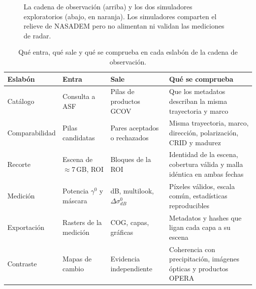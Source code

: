 \documentclass[11pt,a4paper]{article}
\newcommand{\gz}{\ensuremath{\gamma^{0}}}
\begin{document}
\begin{figure}[htbp]
\centering
{}
\caption{La cadena de observación (arriba) y los dos simuladores exploratorios (abajo, en naranja). Los
simuladores comparten el relieve de NASADEM pero no alimentan ni validan las mediciones de radar.}
\label{fig:cadena-datos}
\end{figure}

\begin{table}[htbp]
\centering\small
\begin{tabularx}{\linewidth}{p{.19\linewidth}p{.24\linewidth}p{.22\linewidth}X}
\toprule
\textbf{Eslabón} & \textbf{Entra} & \textbf{Sale} & \textbf{Qué se comprueba}\\\midrule
Catálogo & Consulta a ASF & Pilas de productos GCOV & Que los metadatos describan la misma trayectoria y marco\\
Comparabilidad & Pilas candidatas & Pares aceptados o rechazados & Misma trayectoria, marco, dirección, polarización, CRID y madurez\\
Recorte & Escena de $\approx$7\,GB, ROI & Bloques de la ROI & Identidad de la escena, cobertura válida y malla idéntica en ambas fechas\\
Medición & Potencia \gz{} y máscara & dB, multilook, $\Delta\sigma^0_{dB}$ & Píxeles válidos, escala común, estadísticas reproducibles\\
Exportación & Rasters de la medición & COG, capas, gráficas & Metadatos y hashes que ligan cada capa a su escena\\
Contraste & Mapas de cambio & Evidencia independiente & Coherencia con precipitación, imágenes ópticas y productos OPERA\\\bottomrule
\end{tabularx}
\caption{Qué entra, qué sale y qué se comprueba en cada eslabón de la cadena de observación.}
\label{tab:eslabones}
\end{table}
\end{document}
